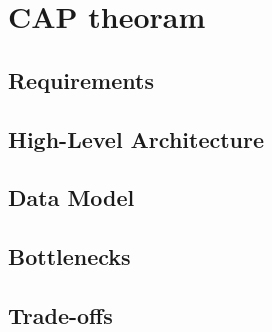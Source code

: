 \chapter{CAP theoram}

\section{Requirements}
\section{High-Level Architecture}
\section{Data Model}
\section{Bottlenecks}
\section{Trade-offs}
